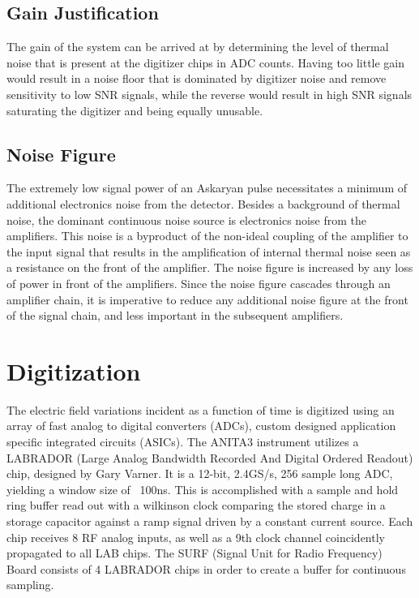 	
	\subsection{Gain Justification}
		The gain of the system can be arrived at by determining the level of thermal noise that is present at the digitizer chips in ADC counts.  Having too little gain would result in a noise floor that is dominated by digitizer noise and remove sensitivity to low SNR signals, while the reverse would result in high SNR signals saturating the digitizer and being equally unusable.


	\subsection{Noise Figure} 
	The extremely low signal power of an Askaryan pulse necessitates a minimum of additional electronics noise from the detector.  Besides a background of thermal noise, the dominant continuous noise source is electronics noise from the amplifiers.  This noise is a byproduct of the non-ideal coupling of the amplifier to the input signal that results in the amplification of internal thermal noise seen as a resistance on the front of the amplifier.  The noise figure is increased by any loss of power in front of the amplifiers.  Since the noise figure cascades through an amplifier chain, it is imperative to reduce any additional noise figure at the front of the signal chain, and less important in the subsequent amplifiers.
	
\section{Digitization}
	The electric field variations incident as a function of time is digitized using an array of fast analog to digital converters (ADCs), custom designed application specific integrated circuits (ASICs).  The ANITA3 instrument utilizes a LABRADOR (Large Analog Bandwidth Recorded And Digital Ordered Readout) chip, designed by Gary Varner.  It is a 12-bit, 2.4GS/s, 256 sample long ADC, yielding a window size of ~100ns.  This is accomplished with a sample and hold ring buffer read out with a wilkinson clock comparing the stored charge in a storage capacitor against a ramp signal driven by a constant current source.  Each chip receives 8 RF analog inputs, as well as a 9th clock channel coincidently propagated to all LAB chips.  The SURF (Signal Unit for Radio Frequency) Board consists of 4 LABRADOR chips in order to create a buffer for continuous sampling.  
